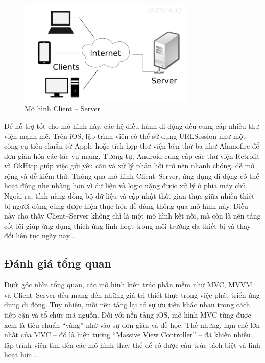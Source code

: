 \begin{figure}[h]
    \centering
    \includegraphics[width=0.75\textwidth]{images/client-server.jpg}
    \caption{Mô hình Client – Server}
    \label{fig:fig14}
  \end{figure}

    \begin{flushleft}
      \hspace*{0.8cm}Để hỗ trợ tốt cho mô hình này, các hệ điều hành di động đều cung cấp nhiều thư viện mạnh mẽ. Trên iOS, lập trình viên có thể sử dụng URLSession như một công cụ tiêu chuẩn từ Apple hoặc tích hợp thư viện bên thứ ba như Alamofire để đơn giản hóa các tác vụ mạng. Tương tự, Android cung cấp các thư viện Retrofit và OkHttp giúp việc gửi yêu cầu và xử lý phản hồi trở nên nhanh chóng, dễ mở rộng và dễ kiểm thử. Thông qua mô hình Client–Server, ứng dụng di động có thể hoạt động nhẹ nhàng hơn vì dữ liệu và logic nặng được xử lý ở phía máy chủ. Ngoài ra, tính năng đồng bộ dữ liệu và cập nhật thời gian thực giữa nhiều thiết bị người dùng cũng được hiện thực hóa dễ dàng thông qua mô hình này. Điều này cho thấy Client–Server không chỉ là một mô hình kết nối, mà còn là nền tảng cốt lõi giúp ứng dụng thích ứng linh hoạt trong môi trường đa thiết bị và thay đổi liên tục ngày nay \cite{scalable_mobile_arch}.
    \end{flushleft}

\subsection{Đánh giá tổng quan}
\renewcommand{\labelitemi}{--}    
    \begin{flushleft}
        \hspace*{0.8cm}Dưới góc nhìn tổng quan, các mô hình kiến trúc phần mềm như MVC, MVVM và Client–Server đều mang đến những giá trị thiết thực trong việc phát triển ứng dụng di động. Tuy nhiên, mỗi nền tảng lại có sự ưu tiên khác nhau trong cách tiếp cận và tổ chức mã nguồn. Đối với nền tảng iOS, mô hình MVC từng được xem là tiêu chuẩn “vàng” nhờ vào sự đơn giản và dễ học. Thế nhưng, hạn chế lớn nhất của MVC – đó là hiện tượng “Massive View Controller” – đã khiến nhiều lập trình viên tìm đến các mô hình thay thế để có được cấu trúc tách biệt và linh hoạt hơn \cite{massive_view_controller}.
    \end{flushleft}


